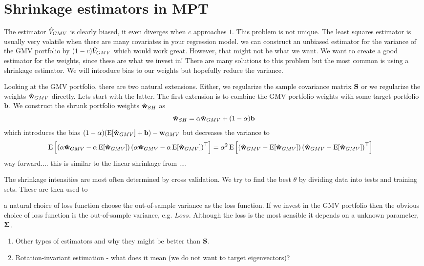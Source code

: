 \documentclass[]{book}\usepackage{knitr}
\begin{document}
\section{Shrinkage estimators in MPT}
The estimator $\hat{V}_{GMV}$ is clearly biased, it even diverges when $c$ approaches $1$. This problem is not unique. The least squares estimator is usually very volatile when there are many covariates in your regression model. we can construct an unbiased estimator for the variance of the GMV portfolio by $(1-c)\hat{V}_{GMV}$ which would work great. However, that might not be what we want. We want to create a good estimator for the weights, since these are what we invest in! There are many solutions to this problem but the most common is using a shrinkage estimator. We will introduce bias to our weights but hopefully reduce the variance.

Looking at the GMV portfolio, there are two natural extensions. Either, we regularize the sample covariance matrix $\mathbf{S}$ or we regularize the weights $\mathbf{\hat{w}}_{GMV}$ directly. Lets start with the latter. The first extension is to combine the GMV portfolio weights with some target portfolio $\mathbf{b}$. We construct the shrunk portfolio weights $\mathbf{\hat{w}}_{SH}$ as
\begin{equation}
  \mathbf{\hat{w}}_{SH} = \alpha\mathbf{\hat{w}}_{GMV} + (1-\alpha)\mathbf{b}
\end{equation}
which introduces the bias $(1-\alpha)(\operatorname{E}[\mathbf{\hat{w}}_{GMV}]+\mathbf{b}) - \mathbf{w}_{GMV}$ but decreases the variance to
\begin{align}
  \operatorname{E}\left[\left(\alpha\mathbf{\hat{w}}_{GMV} - \alpha \operatorname{E}[\mathbf{\hat{w}}_{GMV}]\right)\left(\alpha\mathbf{\hat{w}}_{GMV} - \alpha \operatorname{E}[\mathbf{\hat{w}}_{GMV}]\right)^\top\right] 
  & = 
  \alpha^2\operatorname{E}\left[\left(\mathbf{\hat{w}}_{GMV} - \operatorname{E}[\mathbf{\hat{w}}_{GMV}]\right)\left(\mathbf{\hat{w}}_{GMV} - \operatorname{E}[\mathbf{\hat{w}}_{GMV}]\right)^\top\right]
\end{align}
\citet{bodnar2018estimation} way forward.... this is similar to the linear shrinkage from \citet{REF}....

The shrinkage intensities are most often determined by cross validation. We try to find the best $\theta$ by dividing data into tests and training sets. These are then used to 

a natural choice of loss function  choose the out-of-sample variance as the loss function. If we invest in the GMV portfolio then the obvious choice of loss function is the out-of-sample variance, e.g. $Loss$. Although the loss is the most sensible it depends on a unknown parameter, $\mathbf{\Sigma}$. 

\begin{enumerate}
	\item Other types of estimators and why they might be better than $\mathbf{S}$.
	\item Rotation-invariant estimation - what does it mean (we do not want to target eigenvectors)?
\end{enumerate}
\end{document}

